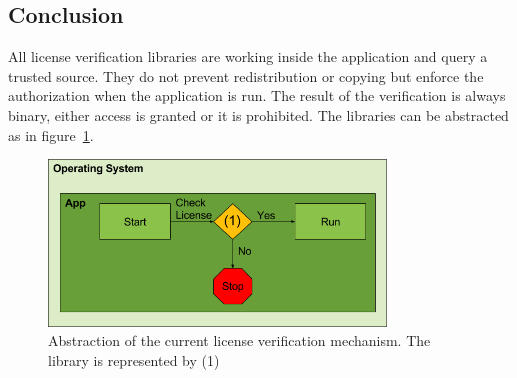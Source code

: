 \subsection{Conclusion} \label{section:license-conclusion}
All license verification libraries are working inside the application and query a trusted source.
They do not prevent redistribution or copying but enforce the authorization when the application is run.
The result of the verification is always binary, either access is granted or it is prohibited.
The libraries can be abstracted as in figure~\ref{fig:verificationNow}.
\begin{figure}[h]
    \centering
    \includegraphics[width=0.8\textwidth]{data/verificationNow.png}
    \caption{Abstraction of the current license verification mechanism. The library is represented by (1)}
    \label{fig:verificationNow}
\end{figure}
